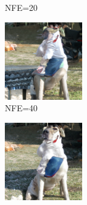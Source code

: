 \documentclass{article}
\begin{document}
\begin{figure}
\begin{subfigure}[b]{0.5\linewidth}
\begin{subfigure}[b]{0.242\linewidth}
        \caption*{NFE=20}
        \end{subfigure}
        \begin{subfigure}[b]{0.242\linewidth}
        \includegraphics[width=\linewidth]{figures/imagenet128/solver_samples/imagenet128_fm_ot_395_20.png}
        \caption*{NFE=40}
        \end{subfigure}
        \begin{subfigure}[b]{0.242\linewidth}
        \includegraphics[width=\linewidth]{figures/imagenet128/solver_samples/imagenet128_fm_ot_395_50.png}

\end{subfigure}
\end{subfigure}
\end{figure}
\end{document}
